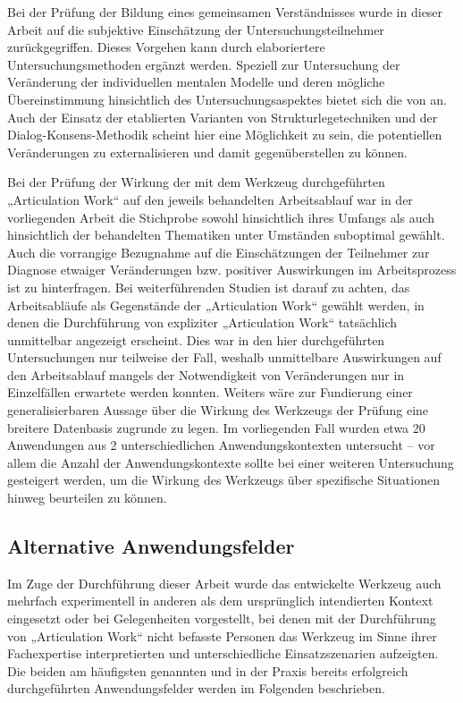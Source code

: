 Bei der Prüfung der Bildung eines gemeinsamen Verständnisses wurde in dieser Arbeit auf die subjektive Einschätzung der Untersuchungsteilnehmer zurückgegriffen. Dieses Vorgehen kann durch elaboriertere Untersuchungsmethoden ergänzt werden. Speziell zur Untersuchung der Veränderung der individuellen mentalen Modelle und deren mögliche Übereinstimmung hinsichtlich des Untersuchungsaspektes bietet sich die von \citep{Ifenthaler06} an. Auch der Einsatz der etablierten Varianten von Strukturlegetechniken und der Dialog-Konsens-Methodik scheint hier eine Möglichkeit zu sein, die potentiellen Veränderungen zu externalisieren und damit gegenüberstellen zu können.

Bei der Prüfung der Wirkung der mit dem Werkzeug durchgeführten „Articulation Work“ auf den jeweils behandelten Arbeitsablauf war in der vorliegenden Arbeit die Stichprobe sowohl hinsichtlich ihres Umfangs als auch hinsichtlich der behandelten Thematiken unter Umständen suboptimal gewählt. Auch die vorrangige Bezugnahme auf die Einschätzungen der Teilnehmer zur Diagnose etwaiger Veränderungen bzw. positiver Auswirkungen im Arbeitsprozess ist zu hinterfragen. Bei weiterführenden Studien ist darauf zu achten, das Arbeitsabläufe als Gegenstände der „Articulation Work“ gewählt werden, in denen die Durchführung von expliziter „Articulation Work“ tatsächlich unmittelbar angezeigt erscheint. Dies war in den hier durchgeführten Untersuchungen nur teilweise der Fall, weshalb unmittelbare Auswirkungen auf den Arbeitsablauf mangels der Notwendigkeit von Veränderungen nur in Einzelfällen erwartete werden konnten. Weiters wäre zur Fundierung einer generalisierbaren Aussage über die Wirkung des Werkzeugs der Prüfung eine breitere Datenbasis zugrunde zu legen. Im vorliegenden Fall wurden etwa 20 Anwendungen aus 2 unterschiedlichen Anwendungskontexten untersucht -- vor allem die Anzahl der Anwendungskontexte sollte bei einer weiteren Untersuchung gesteigert werden, um die Wirkung des Werkzeugs über spezifische Situationen hinweg beurteilen zu können.


\subsection{Alternative Anwendungsfelder} %
\label{sub:alternative_anwendungsfelder}

Im Zuge der Durchführung dieser Arbeit wurde das entwickelte Werkzeug auch mehrfach experimentell in anderen als dem ursprünglich intendierten Kontext eingesetzt oder bei Gelegenheiten vorgestellt, bei denen mit der Durchführung von „Articulation Work“ nicht befasste Personen das Werkzeug im Sinne ihrer Fachexpertise interpretierten und unterschiedliche Einsatzszenarien aufzeigten. Die beiden am häufigsten genannten und in der Praxis bereits erfolgreich durchgeführten Anwendungsfelder werden im Folgenden beschrieben.

